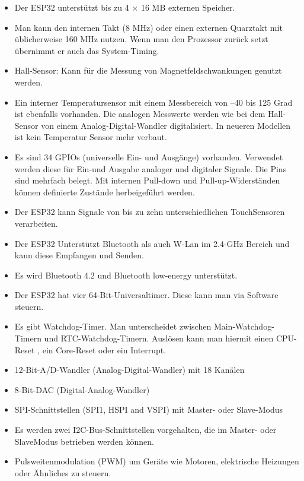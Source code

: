 \textbf{}
\begin{itemize}
    \item Der ESP32 unterstützt bis zu 4 × 16 MB externen Speicher.
    \item Man kann den internen Takt (8 MHz) oder einen
    externen Quarztakt mit üblicherweise 160 MHz nutzen. 
    Wenn man den Prozessor zurück setzt übernimmt er auch das System-Timing.
    \item Hall-Sensor: Kann für die Messung von Magnetfeldschwankungen genutzt werden.
    \item Ein interner Temperatursensor mit einem Messbereich von –40 bis 125 Grad ist ebenfalls vorhanden.
    Die analogen Messwerte werden wie bei dem Hall-Sensor
    von einem Analog-Digital-Wandler digitalisiert. 
    In neueren Modellen ist kein Temperatur Sensor mehr verbaut.
    \item Es sind 34 GPIOs (universelle Ein- und Ausgänge) vorhanden. 
    Verwendet werden diese für Ein-und Ausgabe analoger und digitaler Signale. 
    Die Pins sind mehrfach belegt. 
    Mit internen Pull-down und Pull-up-Widerständen können definierte Zustände herbeigeführt werden.
    \item Der ESP32 kann Signale von bis zu zehn unterschiedlichen TouchSensoren verarbeiten. 
    \item Der ESP32 Unterstützt Bluetooth als auch W-Lan im 2.4-GHz Bereich und kann diese 
    Empfangen und Senden. 
    \item Es wird Bluetooth 4.2 und Bluetooth low-energy unterstützt.
    \item Der ESP32 hat vier 64-Bit-Universaltimer. Diese kann man via Software steuern.
    \item Es gibt Watchdog-Timer. Man unterscheidet zwischen Main-Watchdog-Timern und RTC-Watchdog-Timern. 
    Auslösen kann man hiermit einen CPU-Reset , ein Core-Reset oder ein Interrupt.
    \item  12-Bit-A/D-Wandler (Analog-Digital-Wandler) mit 18 Kanälen 
    \item  8-Bit-DAC (Digital-Analog-Wandler)
    \item SPI-Schnittstellen (SPI1, HSPI and VSPI) mit Master- oder Slave-Modus
    \item Es werden zwei I2C-Bus-Schnittstellen vorgehalten, die im Master- oder SlaveModus betrieben werden können.
    \item Pulsweitenmodulation (PWM) um Geräte wie Motoren, elektrische Heizungen oder Ähnliches zu steuern. 
    
\end{itemize}

